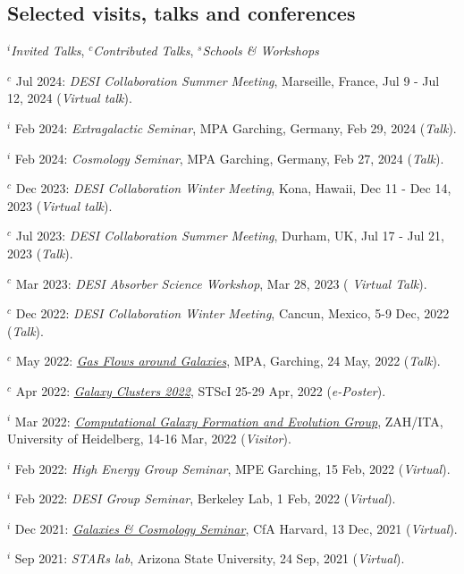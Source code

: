 \documentclass[12pt,letterpaper]{article}
\begin{document}
\subsection{Selected visits, talks and conferences}
$^i$\emph{Invited Talks}, $^c$\emph{Contributed Talks}, $^s$\emph{Schools \& Workshops}
\begin{list}{}{\cvlist}
\item $^c$ Jul 2024:  \emph{DESI Collaboration Summer Meeting}, Marseille, France,   Jul 9 - Jul 12, 2024 (\textit{Virtual talk}).
\item $^i$ Feb 2024:  \emph{Extragalactic Seminar}, MPA Garching, Germany, Feb 29, 2024 (\textit{Talk}).
\item $^i$ Feb 2024:  \emph{Cosmology Seminar}, MPA Garching, Germany, Feb 27, 2024 (\textit{Talk}).
\item $^c$ Dec 2023:  \emph{DESI Collaboration Winter Meeting}, Kona, Hawaii, Dec 11 - Dec 14, 2023 (\textit{Virtual talk}).
\item $^c$ Jul 2023:  \emph{DESI Collaboration Summer Meeting}, Durham, UK, Jul 17 - Jul 21, 2023 (\textit{Talk}).
\item $^c$ Mar 2023:  \emph{DESI Absorber Science Workshop}, Mar 28, 2023 (\textit{ Virtual Talk}).
\item $^c$ Dec 2022:  \emph{DESI Collaboration Winter Meeting}, Cancun, Mexico, 5-9 Dec, 2022 (\textit{Talk}).
\item $^c$ May 2022:  \emph{\href{https://indico.ph.tum.de/event/7018/}{Gas Flows around Galaxies}}, MPA, Garching, 24 May, 2022 (\textit{Talk}).
\item $^c$ Apr 2022:  \emph{\href{https://www.stsci.edu/contents/events/stsci/2022/april/galaxy-clusters-2022-challenging-our-cosmological-perspectives}{Galaxy Clusters 2022}}, STScI 25-29 Apr, 2022 (\textit{e-Poster}).
\item $^i$ Mar 2022:  \emph{\href{https://zah.uni-heidelberg.de/research-groups\#c2659}{Computational Galaxy Formation and Evolution Group}}, ZAH/ITA, University of Heidelberg, 14-16 Mar, 2022 (\textit{Visitor}).
\item $^i$ Feb 2022:  \emph{High Energy Group Seminar}, MPE Garching, 15 Feb, 2022 (\textit{Virtual}).
\item $^i$ Feb 2022:  \emph{DESI Group Seminar}, Berkeley Lab, 1 Feb, 2022 (\textit{Virtual}).
\item $^i$ Dec 2021:  \emph{\href{https://pweb.cfa.harvard.edu/calendar/event/9298}{Galaxies \& Cosmology Seminar}}, CfA Harvard, 13 Dec, 2021 (\textit{Virtual}).
\item $^i$ Sep 2021:  \textit{STARs lab}, Arizona State University, 24 Sep, 2021 (\textit{Virtual}).


\end{list}
\end{document}
